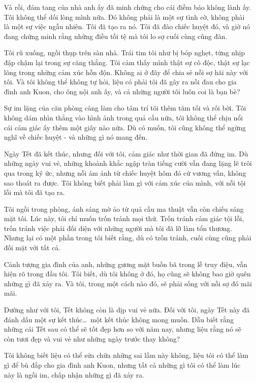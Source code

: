 \documentclass[../main.tex]{subfiles}
\begin{document}
Và rồi, đám tang của nhà anh ấy đã minh chứng cho cái điềm báo không lành ấy. Tôi không thể dối lòng mình nữa. Đó không phải là một sự tình cờ, không phải là một sự việc ngẫu nhiên. Tôi đã tạo ra nó. Tôi đã đào chiếc huyệt đó, và giờ nó đang chứng minh rằng những điều tồi tệ mà tôi lo sợ cuối cùng cũng đãn.

Tôi rũ xuống, ngồi thụp trên sàn nhà. Trái tim tôi như bị bóp nghẹt, từng nhịp đập chậm lại trong sự căng thẳng. Tôi cảm thấy mình thật sự cô độc, thật sự lạc lõng trong những cảm xúc hỗn độn. Không ai ở đây để chia sẻ nỗi sợ hãi này với tôi. Và tôi không thể không tự hỏi, liệu có phải tôi đã gây ra nỗi đau cho gia đình anh Kuon, cho ông nội anh ấy, và cả những người tôi luôn coi là bạn bè?

Sự im lặng của căn phòng càng làm cho tâm trí tôi thêm tăm tối và rối bời. Tôi không dám nhìn thẳng vào hình ảnh trong quả cầu nữa, tôi không thể chịu nổi cái cảm giác ấy thêm một giây nào nữa. Dù có muốn, tôi cũng không thể ngừng nghĩ về chiếc huyệt - và những gì nó mang đến.

Ngày Tết đã kết thúc, nhưng đối với tôi, cảm giác như thời gian đã đứng im. Dù những ngày vui vẻ, những khoảnh khắc ngập tràn tiếng cười vẫn đang lặng lẽ trôi qua trong ký ức, nhưng nỗi ám ảnh từ chiếc huyệt hôm đó cứ vương vấn, không sao thoát ra được. Tôi không biết phải làm gì với cảm xúc của mình, với nỗi tội lỗi mà tôi đã tạo ra.

Tôi ngồi trong phòng, ánh sáng mờ ảo từ quả cầu ma thuật vẫn còn chiếu sáng mặt tôi. Lúc này, tôi chỉ muốn trốn tránh mọi thứ. Trốn tránh cảm giác tội lỗi, trốn tránh việc phải đối diện với những người mà tôi đã lỡ làm tổn thương. Nhưng lại có một phần trong tôi biết rằng, dù có trốn tránh, cuối cùng cũng phải đối mặt với tất cả.

Cảnh tượng gia đình của anh, những gương mặt buồn bã trong lễ truy điệu, vẫn hiện rõ trong đầu tôi. Tôi biết, dù tôi không ở đó, họ cũng sẽ không bao giờ quên những gì đã xảy ra. Và tôi, trong một cách nào đó, sẽ phải sống với nỗi sợ đó mãi mãi.

Dường như với tôi, Tết không còn là dịp vui vẻ nữa. Đối với tôi, ngày Tết này đã đánh dấu một sự kết thúc\dots\ một kết thúc không mong muốn. Dẫu biết rằng những cái Tết sau có thể sẽ tốt đẹp hơn so với năm nay, nhưng liệu rằng nó sẽ còn tươi đẹp và vui vẻ như những ngày trước thay không?

Tôi không biết liệu có thể sửa chữa những sai lầm này không, liệu tôi có thể làm gì để bù đắp cho gia đình anh Kuon, nhưng tất cả những gì tôi có thể làm lúc này là ngồi im, chấp nhận những gì đã xảy ra.
\end{document}
